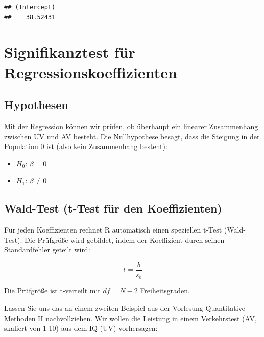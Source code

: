 \documentclass[
]{book}
\providecommand{\tightlist}{%
  \setlength{\itemsep}{0pt}\setlength{\parskip}{0pt}}
\begin{document}
\begin{verbatim}
## (Intercept) 
##    38.52431
\end{verbatim}

\section{Signifikanztest für Regressionskoeffizienten}\label{signifikanztest-fuxfcr-regressionskoeffizienten}

\subsection{Hypothesen}\label{hypothesen-6}

Mit der Regression können wir prüfen, ob überhaupt ein linearer Zusammenhang zwischen UV und AV besteht. Die Nullhypothese besagt, dass die Steigung in der Population 0 ist (also kein Zusammenhang besteht):

\begin{itemize}
\tightlist
\item
  \(H_0\): \(\beta = 0\)
\item
  \(H_1\): \(\beta \neq 0\)
\end{itemize}

\subsection{Wald-Test (t-Test für den Koeffizienten)}\label{wald-test-t-test-fuxfcr-den-koeffizienten}

Für jeden Koeffizienten rechnet R automatisch einen speziellen t-Test (Wald-Test). Die Prüfgröße wird gebildet, indem der Koeffizient durch seinen Standardfehler geteilt wird:

\[t=\frac{b}{s_b}\]

Die Prüfgröße ist t-verteilt mit \(df=N-2\) Freiheitsgraden.

Lassen Sie uns das an einem zweiten Beispiel aus der Vorlesung Quantitative Methoden II nachvollziehen. Wir wollen die Leistung in einem Verkehrstest (AV, skaliert von 1-10) aus dem IQ (UV) vorhersagen:
\end{document}
